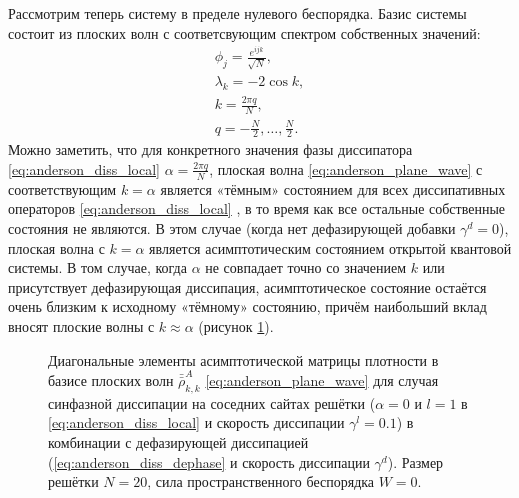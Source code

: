 Рассмотрим теперь систему в пределе нулевого беспорядка. Базис системы состоит из плоских волн с соответсвующим спектром собственных значений:
\begin{equation}
	\label{eq:anderson_plane_wave}
	\begin{gathered}
		\phi_j = \frac{e^{i j k}}{\sqrt{N}}, \\
		\lambda_k = -2 \cos{k}, \\
		k = \frac{2 \pi q}{N}, \\
		q = -\frac{N}{2}, \ldots, \frac{N}{2}.
	\end{gathered}
\end{equation}
Можно заметить, что для конкретного значения фазы диссипатора \cref{eq:anderson_diss_local} \(\alpha = \frac{2 \pi q}{N}\), плоская волна  \cref{eq:anderson_plane_wave} с соответствующим \(k=\alpha\) является «тёмным» состоянием для всех диссипативных операторов \cref{eq:anderson_diss_local} \cite{Diehl2008, Kraus2008}, в то время как все остальные собственные состояния не являются.
В этом случае (когда нет дефазирующей добавки \(\gamma^d = 0\)), плоская волна с \(k = \alpha\) является асимптотическим состоянием открытой квантовой системы. 
В том случае, когда \(\alpha\) не совпадает точно со значением \(k\) или присутствует дефазирующая диссипация, асимптотическое состояние остаётся очень близким к исходному «тёмному» состоянию, причём наибольший вклад вносят плоские волны с \(k \approx \alpha\) (рисунок \cref{fig:anderson_rho_nn_zero_disorder}).
\begin{figure}[ht]
	\caption[Диагональные элементы асимптотической матрицы плотности в базисе Андерсоновских мод при нулевом беспорядке в зависимости от разных типов диссипации]{
		Диагональные элементы асимптотической матрицы плотности в базисе плоских волн \(\bar{\bar{\rho}}^A_{k,k}\) \cref{eq:anderson_plane_wave} для случая синфазной диссипации на соседних сайтах решётки (\(\alpha=0\) и \(l=1\) в \cref{eq:anderson_diss_local} и скорость диссипации \(\gamma^l=0.1\)) в комбинации с дефазирующей диссипацией (\cref{eq:anderson_diss_dephase} и скорость диссипации \(\gamma^d\)). Размер решётки \(N=20\), сила пространственного беспорядка \(W=0\).
	}
	\label{fig:anderson_rho_nn_zero_disorder}
\end{figure}


